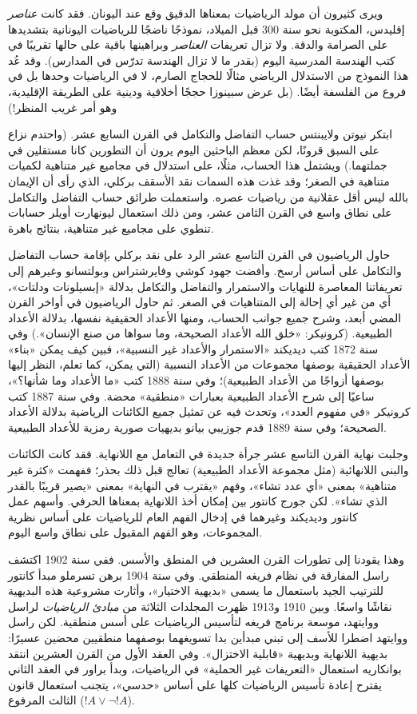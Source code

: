 \documentclass[../../../include/open-logic-section]{subfiles}
\begin{document}
ويرى كثيرون أن مولد الرياضيات بمعناها الدقيق وقع عند اليونان. فقد
كانت \emph{عناصر} إقليدس، المكتوبة نحو سنة 300 قبل الميلاد، نموذجًا
ناضجًا للرياضيات اليونانية بتشديدها على الصرامة والدقة. ولا تزال
تعريفات \emph{العناصر} وبراهينها باقية على حالها تقريبًا في كتب
الهندسة المدرسية اليوم (بقدر ما لا تزال الهندسة تدرّس في المدارس).
وقد عُد هذا النموذج من الاستدلال الرياضي مثالًا للحجاج الصارم، لا في
الرياضيات وحدها بل في فروع من الفلسفة أيضًا. (بل عرض سبينوزا حججًا
أخلاقية ودينية على الطريقة الإقليدية، وهو أمر غريب المنظر!)

ابتكر نيوتن ولايبنتس حساب التفاضل والتكامل في القرن السابع عشر.
(واحتدم نزاع على السبق قرونًا، لكن معظم الباحثين اليوم يرون أن
التطورين كانا مستقلين في جملتهما.) ويشتمل هذا الحساب، مثلًا، على
استدلال في مجاميع غير متناهية لكميات متناهية في الصغر؛ وقد غذت هذه
السمات نقد الأسقف بركلي، الذي رأى أن الإيمان بالله ليس أقل عقلانية
من رياضيات عصره. واستعملت طرائق حساب التفاضل والتكامل على نطاق واسع
في القرن الثامن عشر، ومن ذلك استعمال ليونهارت أويلر حسابات تنطوي على
مجاميع غير متناهية، بنتائج باهرة.

حاول الرياضيون في القرن التاسع عشر الرد على نقد بركلي بإقامة حساب
التفاضل والتكامل على أساس أرسخ. وأفضت جهود كوشي وفايرشتراس وبولتسانو
وغيرهم إلى تعريفاتنا المعاصرة للنهايات والاستمرار والتفاضل والتكامل
بدلالة «إبسيلونات ودلتات»، أي من غير أي إحالة إلى المتناهيات في
الصغر. ثم حاول الرياضيون في أواخر القرن المضي أبعد، وشرح جميع جوانب
الحساب، ومنها الأعداد الحقيقية نفسها، بدلالة الأعداد الطبيعية.
(كرونيكر: «خلق الله الأعداد الصحيحة، وما سواها من صنع الإنسان».) وفي
سنة 1872 كتب ديديكند «الاستمرار والأعداد غير النسبية»، فبين كيف يمكن
«بناء» الأعداد الحقيقية بوصفها مجموعات من الأعداد النسبية (التي يمكن،
كما تعلم، النظر إليها بوصفها أزواجًا من الأعداد الطبيعية)؛ وفي سنة
1888 كتب «ما الأعداد وما شأنها؟»، ساعيًا إلى شرح الأعداد الطبيعية
بعبارات «منطقية» محضة. وفي سنة 1887 كتب كرونيكر «في مفهوم العدد»،
وتحدث فيه عن تمثيل جميع الكائنات الرياضية بدلالة الأعداد الصحيحة؛ وفي
سنة 1889 قدم جوزيبي بيانو بديهيات صورية رمزية للأعداد الطبيعية.

وجلبت نهاية القرن التاسع عشر جرأة جديدة في التعامل مع اللانهاية. فقد
كانت الكائنات والبنى اللانهائية (مثل مجموعة الأعداد الطبيعية) تعالج
قبل ذلك بحذر؛ ففهمت «كثرة غير متناهية» بمعنى «أي عدد تشاء»، وفهم
«يقترب في النهاية» بمعنى «يصير قريبًا بالقدر الذي تشاء». لكن جورج
كانتور بين إمكان أخذ اللانهاية بمعناها الحرفي. وأسهم عمل كانتور
وديديكند وغيرهما في إدخال الفهم العام للرياضيات على أساس نظرية
المجموعات، وهو الفهم المقبول على نطاق واسع اليوم.

وهذا يقودنا إلى تطورات القرن العشرين في المنطق والأسس. ففي سنة 1902
اكتشف راسل المفارقة في نظام فريغه المنطقي. وفي سنة 1904 برهن تسرملو
مبدأ كانتور للترتيب الجيد باستعمال ما يسمى «بديهية الاختيار»، وأثارت
مشروعية هذه البديهية نقاشًا واسعًا. وبين 1910 و1913 ظهرت المجلدات
الثلاثة من \emph{مبادئ الرياضيات} لراسل ووايتهد، موسعة برنامج فريغه
لتأسيس الرياضيات على أسس منطقية. لكن راسل ووايتهد اضطرا للأسف إلى
تبني مبدأين بدا تسويغهما بوصفهما منطقيين محضين عسيرًا: بديهية
اللانهاية وبديهية «قابلية الاختزال». وفي العقد الأول من القرن العشرين
انتقد بوانكاريه استعمال «التعريفات غير الحملية» في الرياضيات، وبدأ
براور في العقد الثاني يقترح إعادة تأسيس الرياضيات كلها على أساس
«حدسي»، يتجنب استعمال قانون الثالث المرفوع ($!A\lor\lnot !A$).
\end{document}
